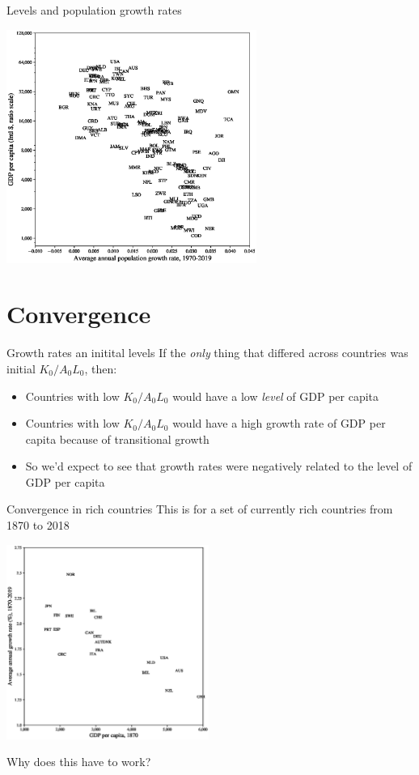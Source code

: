 \begin{frame}{Levels and population growth rates}
\begin{center}
\includegraphics[height = 3in]{../Figures/fig-ch3-fig6.eps}
\end{center}
\end{frame}

\section{Convergence}
\begin{frame}{Growth rates an initital levels}
If the \textit{only} thing that differed across countries was initial $K_0/A_0L_0$, then:
\begin{itemize}
	\item Countries with low $K_0/A_0 L_0$ would have a low \textit{level} of GDP per capita
	\item Countries with low $K_0/A_0 L_0$ would have a high growth rate of GDP per capita because of transitional growth
	\item So we'd expect to see that growth rates were negatively related to the level of GDP per capita
\end{itemize}
\end{frame}

\begin{frame}{Convergence in rich countries}
This is for a set of currently rich countries from 1870 to 2018
\begin{center}
\includegraphics[height = 2.5in]{../Figures/fig-ch3-fig7.eps}
\end{center}
Why does this have to work? 
\end{frame}

